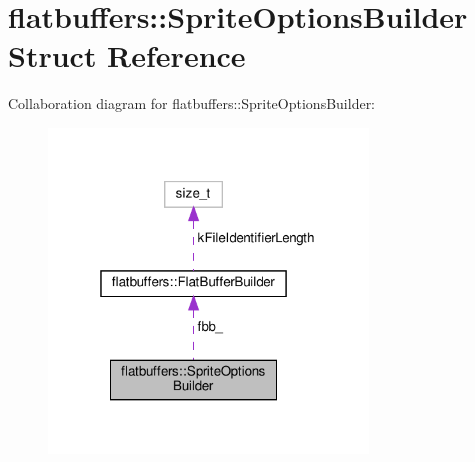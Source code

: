 \hypertarget{structflatbuffers_1_1SpriteOptionsBuilder}{}\section{flatbuffers\+:\+:Sprite\+Options\+Builder Struct Reference}
\label{structflatbuffers_1_1SpriteOptionsBuilder}


Collaboration diagram for flatbuffers\+:\+:Sprite\+Options\+Builder\+:
\nopagebreak
\begin{figure}[H]
\begin{center}
\leavevmode
\includegraphics[width=241pt]{structflatbuffers_1_1SpriteOptionsBuilder__coll__graph}
\end{center}
\end{figure}

